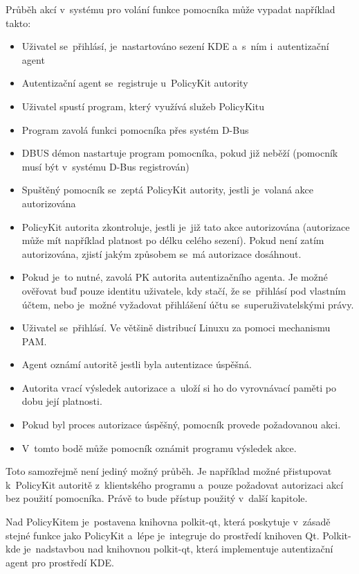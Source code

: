 Průběh akcí v~systému pro volání funkce pomocníka může vypadat například takto:
\begin{itemize}
\item Uživatel se~přihlásí, je~nastartováno sezení KDE a~s~ním i~autentizační agent
\item Autentizační agent se~registruje u~PolicyKit autority
\item Uživatel spustí program, který využívá služeb PolicyKitu
\item Program zavolá funkci pomocníka přes systém D-Bus
\item DBUS démon nastartuje program pomocníka, pokud již neběží (pomocník musí být v~systému D-Bus registrován)
\item Spuštěný pomocník se~zeptá PolicyKit autority, jestli je~volaná akce autorizována
\item PolicyKit autorita zkontroluje, jestli je~již tato akce autorizována (autorizace může mít například platnost po délku celého sezení). Pokud není zatím autorizována, zjistí jakým způsobem se~má autorizace dosáhnout.
\item Pokud je~to nutné, zavolá PK autorita autentizačního agenta. Je možné ověřovat buď pouze identitu uživatele, kdy stačí, že se~přihlásí pod vlastním účtem, nebo je~možné vyžadovat přihlášení účtu se~superuživatelskými právy.
\item Uživatel se~přihlásí. Ve většině distribucí Linuxu za pomoci mechanismu PAM.
\item Agent oznámí autoritě jestli byla autentizace úspěšná.
\item Autorita vrací výsledek autorizace a~uloží si ho do vyrovnávací paměti po dobu její platnosti.
\item Pokud byl proces autorizace úspěšný, pomocník provede požadovanou akci.
\item V~tomto bodě může pomocník oznámit programu výsledek akce.
\end{itemize}

Toto samozřejmě není jediný možný průběh. Je například možné přistupovat k~PolicyKit autoritě z~klientského programu a~pouze požadovat autorizaci akcí bez použití pomocníka. Právě to bude přístup použitý v~další kapitole.

Nad PolicyKitem je~postavena knihovna polkit-qt, která poskytuje v~zásadě stejné funkce jako PolicyKit a~lépe je~integruje do prostředí knihoven Qt. Polkit-kde je~nadstavbou nad knihovnou polkit-qt, která implementuje autentizační agent pro prostředí KDE.

